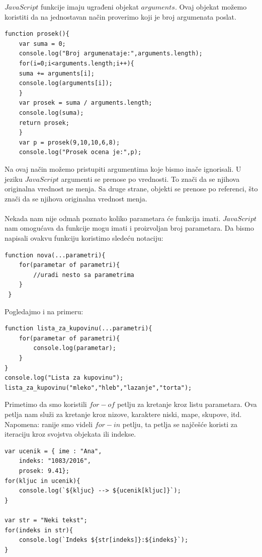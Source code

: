 \documentclass[a4paper]{article}
\begin{document}
$JavaScript$ funkcije imaju ugrađeni objekat $arguments$. Ovaj objekat možemo koristiti da na jednostavan način proverimo koji je broj argumenata poslat.
\begin{lstlisting}[backgroundcolor = \color{lightgray}]
 function prosek(){
	var suma = 0;
	console.log("Broj argumenataje:",arguments.length);
	for(i=0;i<arguments.length;i++){
    suma += arguments[i];
	console.log(arguments[i]);
    }
	var prosek = suma / arguments.length;
    console.log(suma);
	return prosek;
    }
	var p = prosek(9,10,10,6,8);
    console.log("Prosek ocena je:",p);	
\end{lstlisting}
Na ovaj način možemo pristupiti argumentima koje bismo inače ignorisali.
U jeziku $JavaScript$ argumenti se prenose po vrednosti. To znači da se njihova originalna vrednost ne menja. Sa druge strane, objekti se prenose po referenci, što znači da se njihova originalna vrednost menja.\\\\
Nekada nam nije odmah poznato koliko parametara će funkcija imati. $JavaScript$ nam omogućava da funkcije mogu imati i proizvoljan broj parametara. Da bismo napisali ovakvu funkciju koristimo sledeću notaciju:
\begin{lstlisting}[backgroundcolor = \color{lightgray}]
 function nova(...parametri){
	for(parametar of parametri){
		//uradi nesto sa parametrima	
	} 
 }
\end{lstlisting}
Pogledajmo i na primeru:
\begin{lstlisting}[backgroundcolor = \color{lightgray}]
function lista_za_kupovinu(...parametri){
	for(parametar of parametri){
    	console.log(parametar);    
    } 
}
console.log("Lista za kupovinu");
lista_za_kupovinu("mleko","hleb","lazanje","torta");
\end{lstlisting}
Primetimo da smo koristili $for-of$ petlju za kretanje kroz listu parametara. Ova petlja nam služi za kretanje kroz nizove, karaktere niski, mape, skupove, itd. Napomena: ranije smo videli $for-in$
petlju, ta petlja se najčešće koristi za iteraciju kroz svojstva objekata ili indekse.
\begin{lstlisting}[backgroundcolor = \color{lightgray}]
var ucenik = { ime : "Ana",
	indeks: "1083/2016",
    prosek: 9.41};
for(kljuc in ucenik){
	console.log(`${kljuc} --> ${ucenik[kljuc]}`);
}  

var str = "Neki tekst";
for(indeks in str){
	console.log(`Indeks ${str[indeks]}:${indeks}`);
}
\end{lstlisting}
\end{document}
